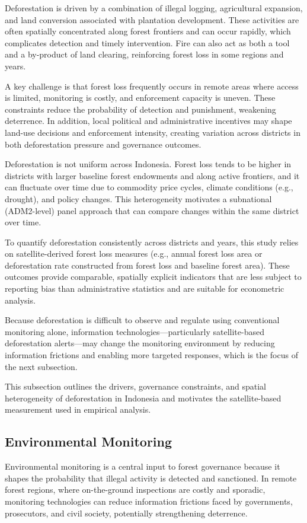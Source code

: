 \documentclass[hidelinks,12pt]{article}
\begin{document}
Deforestation is driven by a combination of illegal logging, agricultural expansion, and land conversion associated with plantation development. These activities are often spatially concentrated along forest frontiers and can occur rapidly, which complicates detection and timely intervention. Fire can also act as both a tool and a by-product of land clearing, reinforcing forest loss in some regions and years.

A key challenge is that forest loss frequently occurs in remote areas where access is limited, monitoring is costly, and enforcement capacity is uneven. These constraints reduce the probability of detection and punishment, weakening deterrence. In addition, local political and administrative incentives may shape land-use decisions and enforcement intensity, creating variation across districts in both deforestation pressure and governance outcomes.

Deforestation is not uniform across Indonesia. Forest loss tends to be higher in districts with larger baseline forest endowments and along active frontiers, and it can fluctuate over time due to commodity price cycles, climate conditions (e.g., drought), and policy changes. This heterogeneity motivates a subnational (ADM2-level) panel approach that can compare changes within the same district over time.

To quantify deforestation consistently across districts and years, this study relies on satellite-derived forest loss measures (e.g., annual forest loss area or deforestation rate constructed from forest loss and baseline forest area). These outcomes provide comparable, spatially explicit indicators that are less subject to reporting bias than administrative statistics and are suitable for econometric analysis.

Because deforestation is difficult to observe and regulate using conventional monitoring alone, information technologies—particularly satellite-based deforestation alerts—may change the monitoring environment by reducing information frictions and enabling more targeted responses, which is the focus of the next subsection.

This subsection outlines the drivers, governance constraints, and spatial heterogeneity of deforestation in Indonesia and motivates the satellite-based measurement used in empirical analysis.

\subsection{Environmental Monitoring} \label{subsec:environment}
Environmental monitoring is a central input to forest governance because it shapes the probability that illegal activity is detected and sanctioned. In remote forest regions, where on-the-ground inspections are costly and sporadic, monitoring technologies can reduce information frictions faced by governments, prosecutors, and civil society, potentially strengthening deterrence.
\end{document}

